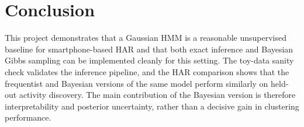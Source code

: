 \section{Conclusion}
This project demonstrates that a Gaussian HMM is a reasonable unsupervised baseline for smartphone-based HAR and that both exact inference and Bayesian Gibbs sampling can be implemented cleanly for this setting. The toy-data sanity check validates the inference pipeline, and the HAR comparison shows that the frequentist and Bayesian versions of the same model perform similarly on held-out activity discovery. The main contribution of the Bayesian version is therefore interpretability and posterior uncertainty, rather than a decisive gain in clustering performance.
